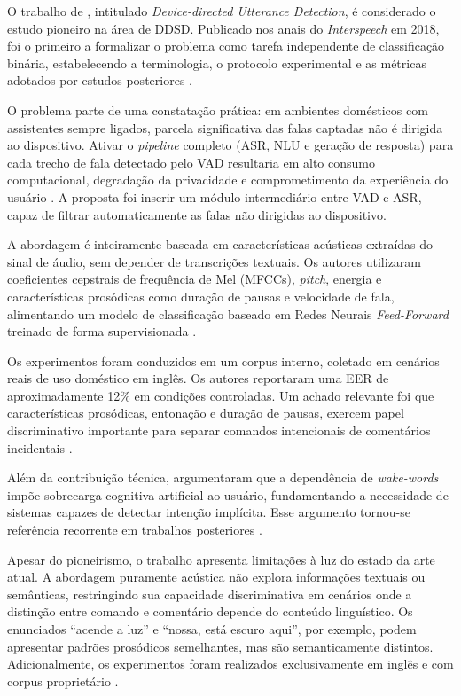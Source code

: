 \documentclass[
    12pt,                %
    openright,           %
    oneside,             %
    a4paper,             %
    english,             %
    brazil               %
]{abntex2}
\begin{document}
O trabalho de , intitulado \textit{Device-directed Utterance Detection}, é considerado o estudo pioneiro na área de DDSD. Publicado nos anais do \textit{Interspeech} em 2018, foi o primeiro a formalizar o problema como tarefa independente de classificação binária, estabelecendo a terminologia, o protocolo experimental e as métricas adotados por estudos posteriores \cite{Mallidi2018, Wagner2024}.

O problema parte de uma constatação prática: em ambientes domésticos com assistentes sempre ligados, parcela significativa das falas captadas não é dirigida ao dispositivo. Ativar o \textit{pipeline} completo (ASR, NLU e geração de resposta) para cada trecho de fala detectado pelo VAD resultaria em alto consumo computacional, degradação da privacidade e comprometimento da experiência do usuário \cite{Mallidi2018}. A proposta foi inserir um módulo intermediário entre VAD e ASR, capaz de filtrar automaticamente as falas não dirigidas ao dispositivo.

A abordagem é inteiramente baseada em características acústicas extraídas do sinal de áudio, sem depender de transcrições textuais. Os autores utilizaram coeficientes cepstrais de frequência de Mel (MFCCs), \textit{pitch}, energia e características prosódicas como duração de pausas e velocidade de fala, alimentando um modelo de classificação baseado em Redes Neurais \textit{Feed-Forward} treinado de forma supervisionada \cite{Mallidi2018}.

Os experimentos foram conduzidos em um corpus interno, coletado em cenários reais de uso doméstico em inglês. Os autores reportaram uma EER de aproximadamente 12\% em condições controladas. Um achado relevante foi que características prosódicas, entonação e duração de pausas, exercem papel discriminativo importante para separar comandos intencionais de comentários incidentais \cite{Mallidi2018}.

Além da contribuição técnica,  argumentaram que a dependência de \textit{wake-words} impõe sobrecarga cognitiva artificial ao usuário, fundamentando a necessidade de sistemas capazes de detectar intenção implícita. Esse argumento tornou-se referência recorrente em trabalhos posteriores \cite{Nie2021, Wagner2024}.

Apesar do pioneirismo, o trabalho apresenta limitações à luz do estado da arte atual. A abordagem puramente acústica não explora informações textuais ou semânticas, restringindo sua capacidade discriminativa em cenários onde a distinção entre comando e comentário depende do conteúdo linguístico. Os enunciados ``acende a luz'' e ``nossa, está escuro aqui'', por exemplo, podem apresentar padrões prosódicos semelhantes, mas são semanticamente distintos. Adicionalmente, os experimentos foram realizados exclusivamente em inglês e com corpus proprietário \cite{Wagner2024, Dighe2024}.
\end{document}
